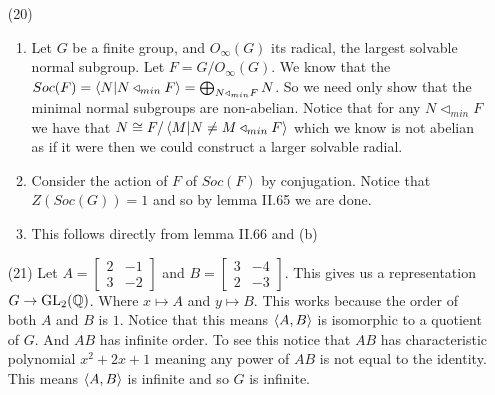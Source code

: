 \documentclass[12pt]{amsart}
\begin{document}
\begin{itemize}
   \item[(20)] 
   \begin{enumerate}[label= (\alph*)]
      \item Let $G$ be a finite group, and $O_\infty(G)$ its radical, the largest 
      solvable normal subgroup. Let $F=G/O_\infty(G)$. We know that the 
      $Soc(F)=\left\langle N | N\triangleleft_{min} F \right\rangle=\bigoplus_{N\triangleleft_{min} F} N$.
      So we need only show that the minimal normal subgroups are non-abelian.
      Notice that for any $N\triangleleft_{min} F$ we have that 
      $N\cong F/\left\langle M | N\neq M\triangleleft_{min} F \right\rangle$ which we know is not abelian as
      if it were then we could construct a larger solvable radial.
      \item Consider the action of $F$ of $Soc(F)$ by conjugation. Notice that $Z(Soc(G))=1$ and so by lemma II.65 we are done.
      
      \item This follows directly from lemma II.66 and (b) 
   \end{enumerate}

   \item[(21)] Let $A=\begin{bmatrix}2 &-1\\3&-2\end{bmatrix}$ and
    $B=\begin{bmatrix}3 &-4\\2&-3\end{bmatrix}$. This gives us a representation $G\rightarrow \text{GL}_2(\mathbb{Q})$.
    Where $x\mapsto A$ and $y\mapsto B$. This works because the order of both $A$ and $B$ is $1$.
    Notice that this means $\left\langle A,B \right\rangle$ is isomorphic to a quotient of $G$. And $AB$ has infinite order.
    To see this notice that $AB$ has characteristic polynomial $x^2+2x+1$ meaning any power of $AB$ is not 
    equal to the identity. This means $\left\langle A,B \right\rangle$ is infinite and so $G$ is infinite.

\end{itemize}
\end{document}

